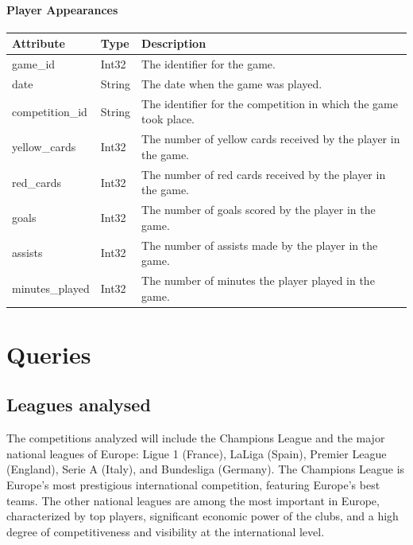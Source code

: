 \documentclass{Configuration_Files/PoliMi3i_thesis}
\begin{document}
\subsubsection{Player Appearances}
\begin{tabular}{|l|l|p{8cm}|}
    \hline
    \rowcolor{bluepoli!40}
    \textbf{Attribute}      & \textbf{Type}    & \textbf{Description} \\ \hline
    game\_id                & Int32            & The identifier for the game. \\ \hline
    date                    & String           & The date when the game was played. \\ \hline
    competition\_id         & String           & The identifier for the competition in which the game took place. \\ \hline
    yellow\_cards           & Int32            & The number of yellow cards received by the player in the game. \\ \hline
    red\_cards              & Int32            & The number of red cards received by the player in the game. \\ \hline
    goals                   & Int32            & The number of goals scored by the player in the game. \\ \hline
    assists                 & Int32            & The number of assists made by the player in the game. \\ \hline
    minutes\_played         & Int32            & The number of minutes the player played in the game. \\ \hline
    \end{tabular}

\chapter{Queries}
\section{Leagues analysed}
The competitions analyzed will include the Champions League and the major national leagues of Europe: Ligue 1 (France), LaLiga (Spain), Premier League (England), Serie A (Italy), and Bundesliga (Germany). The Champions League is Europe's most prestigious international competition, featuring Europe's best teams. The other national leagues are among the most important in Europe, characterized by top players, significant economic power of the clubs, and a high degree of competitiveness and visibility at the international level.
\end{document}
